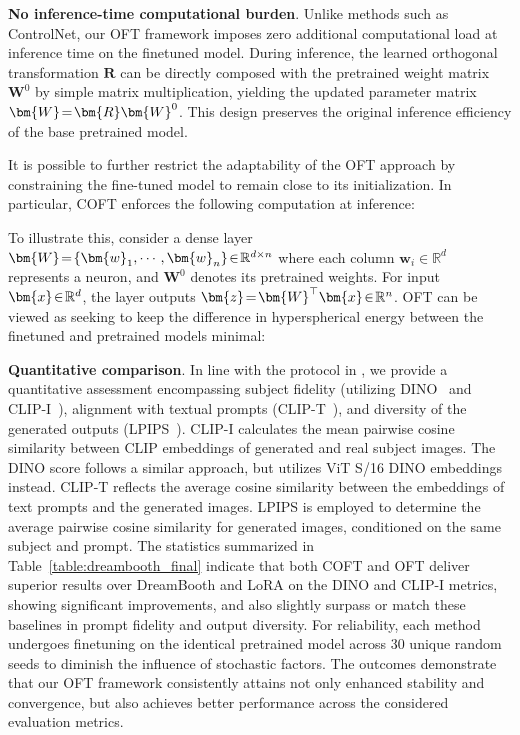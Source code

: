 \textbf{No inference-time computational burden}. Unlike methods such as ControlNet, our OFT framework imposes zero additional computational load at inference time on the finetuned model. During inference, the learned orthogonal transformation $\bm{R}$ can be directly composed with the pretrained weight matrix $\bm{W}^0$ by simple matrix multiplication, yielding the updated parameter matrix $\thickmuskip=2mu \medmuskip=2mu \bm{W}=\bm{R}\bm{W}^0$. This design preserves the original inference efficiency of the base pretrained model.

It is possible to further restrict the adaptability of the OFT approach by constraining the fine-tuned model to remain close to its initialization. In particular, COFT enforces the following computation at inference:

To illustrate this, consider a dense layer $\thickmuskip=2mu \medmuskip=2mu \bm{W}=\{\bm{w}_1,\cdots,\bm{w}_n\}\in\mathbb{R}^{d\times n}$ where each column $\bm{w}_i\in\mathbb{R}^{d}$ represents a neuron, and $\bm{W}^0$ denotes its pretrained weights. For input $\thickmuskip=2mu \medmuskip=2mu \bm{x}\in\mathbb{R}^d$, the layer outputs $\thickmuskip=2mu \medmuskip=2mu \bm{z}=\bm{W}^\top\bm{x}\in\mathbb{R}^n$. OFT can be viewed as seeking to keep the difference in hyperspherical energy between the finetuned and pretrained models minimal:

\textbf{Quantitative comparison}. In line with the protocol in \cite{ruiz2023dreambooth}, we provide a quantitative assessment encompassing subject fidelity (utilizing DINO~\cite{caron2021emerging} and CLIP-I~\cite{radford2021learning}), alignment with textual prompts (CLIP-T~\cite{radford2021learning}), and diversity of the generated outputs (LPIPS~\cite{zhang2018unreasonable}). CLIP-I calculates the mean pairwise cosine similarity between CLIP embeddings of generated and real subject images. The DINO score follows a similar approach, but utilizes ViT S/16 DINO embeddings instead. CLIP-T reflects the average cosine similarity between the embeddings of text prompts and the generated images. LPIPS is employed to determine the average pairwise cosine similarity for generated images, conditioned on the same subject and prompt. The statistics summarized in Table~\ref{table:dreambooth_final} indicate that both COFT and OFT deliver superior results over DreamBooth and LoRA on the DINO and CLIP-I metrics, showing significant improvements, and also slightly surpass or match these baselines in prompt fidelity and output diversity. For reliability, each method undergoes finetuning on the identical pretrained model across 30 unique random seeds to diminish the influence of stochastic factors. The outcomes demonstrate that our OFT framework consistently attains not only enhanced stability and convergence, but also achieves better performance across the considered evaluation metrics.

